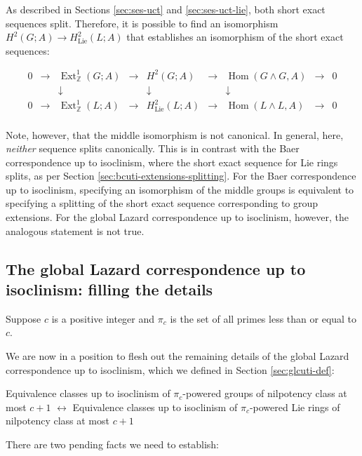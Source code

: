 As described in Sections \ref{sec:ses-uct} and
\ref{sec:ses-uct-lie}, both short exact sequences
split. Therefore, it is possible to find an isomorphism $H^2(G;A) \to
H^2_{\text{Lie}}(L;A)$ that establishes an isomorphism of the short
exact sequences:

$$\begin{array}{ccccccccc}
  0 &\to &\operatorname{Ext}^1_{\mathbb{Z}}(G;A) &\to &H^2(G;A) &\to &\operatorname{Hom}(G \wedge G,A) &\to &0\\
  & & \downarrow & & \downarrow & & \downarrow & & \\
  0 &\to &\operatorname{Ext}^1_{\mathbb{Z}}(L;A) & \to & H^2_{\text{Lie}}(L;A) & \to & \operatorname{Hom}(L \wedge L, A) & \to & 0\\
\end{array}$$

Note, however, that the middle isomorphism is not canonical. In
general, here, {\em neither} sequence splits canonically. This is in
contrast with the Baer correspondence up to isoclinism, where the
short exact sequence for Lie rings splits, as per Section
\ref{sec:bcuti-extensions-splitting}. For the Baer correspondence up
to isoclinism, specifying an isomorphism of the middle groups is
equivalent to specifying a splitting of the short exact sequence
corresponding to group extensions. For the global Lazard
correspondence up to isoclinism, however, the analogous statement is
not true.

\subsection{The global Lazard correspondence up to isoclinism: filling the details}

Suppose $c$ is a positive integer and $\pi_c$ is the set of all primes
less than or equal to $c$.

We are now in a position to flesh out the remaining details of the
global Lazard correspondence up to isoclinism, which we defined in Section
\ref{sec:glcuti-def}:

\newpage

\begin{center}
  Equivalence classes up to isoclinism of $\pi_c$-powered groups of
  nilpotency class at most $c + 1$ $\leftrightarrow$ Equivalence
  classes up to isoclinism of $\pi_c$-powered Lie rings of nilpotency
  class at most $c + 1$
\end{center}

There are two pending facts we need to establish:

